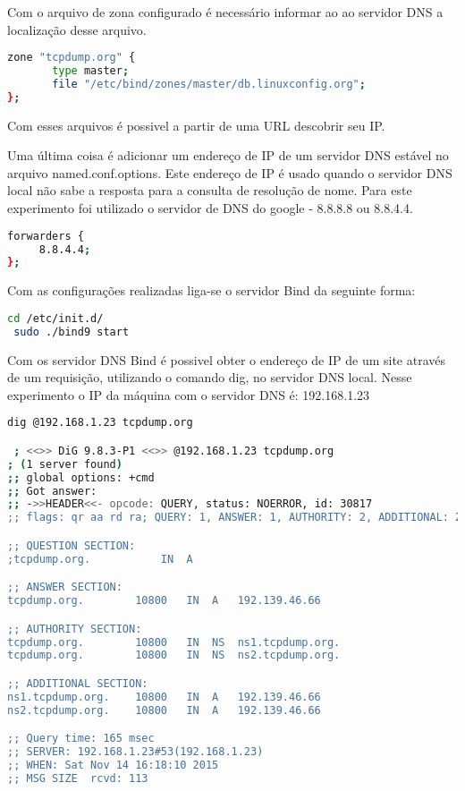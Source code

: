 \documentclass[a4paper]{report} %
\begin{document}
Com o arquivo de zona configurado é necessário informar ao ao servidor DNS a localização desse arquivo.

\begin{lstlisting}[language=bash]
zone "tcpdump.org" {
       type master;
       file "/etc/bind/zones/master/db.linuxconfig.org";
};
\end{lstlisting}

Com esses arquivos é possivel a partir de uma URL descobrir seu IP.

Uma última coisa é adicionar um endereço de IP de um servidor DNS estável no arquivo named.conf.options. Este endereço de IP é usado quando o servidor DNS local não sabe a resposta para a consulta de resolução de nome. Para este experimento foi utilizado o servidor de DNS do google - 8.8.8.8 ou 8.8.4.4.

\begin{lstlisting}[language=bash]
 forwarders {
     8.8.4.4;
};
\end{lstlisting}

Com as configurações realizadas liga-se o servidor Bind da seguinte forma:

\begin{lstlisting}[language=bash]
 cd /etc/init.d/
 sudo ./bind9 start
\end{lstlisting}

Com os servidor DNS Bind é possivel obter o endereço de IP de um site através de um requisição, utilizando o comando dig, no servidor DNS local. Nesse experimento o IP da máquina com o servidor DNS é: 192.168.1.23

\begin{lstlisting}[language=bash]
 dig @192.168.1.23 tcpdump.org

 ; <<>> DiG 9.8.3-P1 <<>> @192.168.1.23 tcpdump.org
; (1 server found)
;; global options: +cmd
;; Got answer:
;; ->>HEADER<<- opcode: QUERY, status: NOERROR, id: 30817
;; flags: qr aa rd ra; QUERY: 1, ANSWER: 1, AUTHORITY: 2, ADDITIONAL: 2

;; QUESTION SECTION:
;tcpdump.org.			IN	A

;; ANSWER SECTION:
tcpdump.org.		10800	IN	A	192.139.46.66

;; AUTHORITY SECTION:
tcpdump.org.		10800	IN	NS	ns1.tcpdump.org.
tcpdump.org.		10800	IN	NS	ns2.tcpdump.org.

;; ADDITIONAL SECTION:
ns1.tcpdump.org.	10800	IN	A	192.139.46.66
ns2.tcpdump.org.	10800	IN	A	192.139.46.66

;; Query time: 165 msec
;; SERVER: 192.168.1.23#53(192.168.1.23)
;; WHEN: Sat Nov 14 16:18:10 2015
;; MSG SIZE  rcvd: 113
\end{lstlisting}
\end{document}
